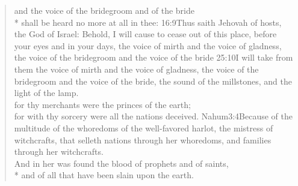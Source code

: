 \begin{verse}
and the voice of the bridegroom and of the bride\\*\vin
shall be heard no more at all in thee:%
					{16:9}{Thus saith Jehovah of hosts, the God of Israel: Behold, I will cause to cease out of this place, before your eyes and in your days, the voice of mirth and the voice of gladness, the voice of the bridegroom and the voice of the bride}%
					{25:10}{I will take from them the voice of mirth and the voice of gladness, the voice of the bridegroom and the voice of the bride, the sound of the millstones, and the light of the lamp.}\\
 for thy merchants were the princes of the earth;%
	\\
 for with thy sorcery were all the nations deceived.%
				{Nahum}{3:4}{Because of the multitude of the whoredoms of the well-favored harlot, the mistress of witchcrafts, that selleth nations through her whoredoms, and families through her witchcrafts.}\\
And in her was found the blood of prophets and of saints,\\*\vin
and of all that have been slain upon the earth.%
\end{verse}

